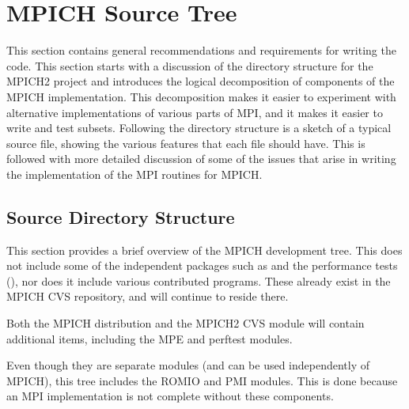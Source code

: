 \documentclass{article}
\begin{document}
\section{MPICH Source Tree}
\label{sec:general}

This section contains general recommendations and requirements for
writing the code.  
This section starts with a discussion of the directory structure for the
MPICH2 project and introduces the logical decomposition of components of the
MPICH implementation.  This decomposition makes it easier to experiment with
alternative implementations of various parts of MPI, and it makes it easier to
write and test subsets.
Following the directory structure is a sketch of a typical source file,
showing the various features that each file should have.  This is followed
with more detailed discussion of some of the issues that arise in writing the
implementation of the MPI routines for MPICH.

\subsection{Source Directory Structure}
\label{sec:dir-structure}
This section provides a brief overview of the MPICH development tree. 
This does not include some of the independent packages such as  and
the performance tests (), nor does it include various
contributed programs.  These already exist in the MPICH CVS repository, and
will continue to reside there.

Both the MPICH distribution and the MPICH2 CVS module will contain additional
items, including the MPE and perftest modules.  

Even though they are separate modules (and can be used independently
of MPICH), this tree includes the ROMIO and PMI modules.  This is done
because an MPI implementation is not complete without these components.
\end{document}
